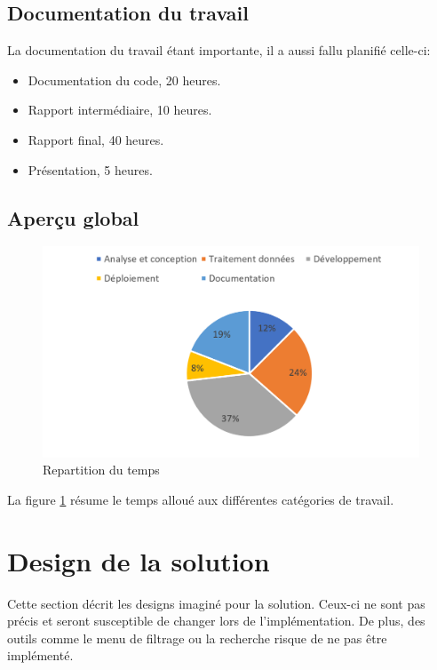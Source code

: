 \documentclass[
    iai, %
    il, %
]{heig-tb}
\begin{document}
\subsection{Documentation du travail}
La documentation du travail étant importante, il a aussi fallu planifié celle-ci:

\begin{itemize}
    \item Documentation du code, 20 heures.
    \item Rapport intermédiaire, 10 heures.
    \item Rapport final, 40 heures.
    \item Présentation, 5 heures.
\end{itemize}

\subsection{Aperçu global}

\begin{figure}[h]
    \centering
    \includegraphics[scale=0.4]{RepartitionTemps.png}
    \caption{Repartition du temps}
    \label{fig:temps1}
\end{figure}

La figure \ref{fig:temps1} résume le temps alloué aux différentes catégories de travail.


\section{Design de la solution}

Cette section décrit les designs imaginé pour la solution.
Ceux-ci ne sont pas précis et seront susceptible de changer lors de l'implémentation.
De plus, des outils comme le menu de filtrage ou la recherche risque de ne pas être implémenté.
\end{document}
